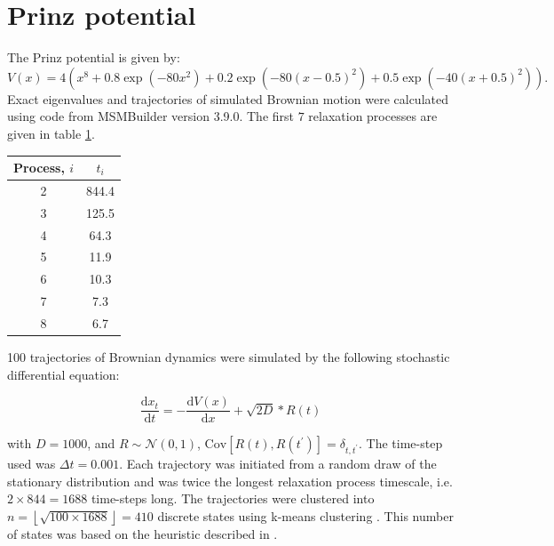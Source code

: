 \section{Prinz potential}
 The Prinz potential is given by: 
\begin{equation}\label{eqn:prinz_pot}
 V(x) = 4\left(x^8 + 0.8 \exp{\left(-80 x^2\right)} + 0.2 \exp{\left(-80 (x-0.5)^2\right)} + 0.5\exp{\left(-40 (x+0.5)^2\right)}\right).
\end{equation}
Exact eigenvalues and trajectories of simulated Brownian motion were calculated using code from MSMBuilder \cite{beauchampMSMBuilder2ModelingConformational2011} version 3.9.0. The first $7$ relaxation processes are given in table \ref{tab:prinz_its_exact}. 
\begin{table}
 \centering
 \begin{tabular}{|c|c|}
 \hline
 Process, $i$ & $t_i$ \\
 \hline\hline
  2 & 844.4 \\
  3 & 125.5 \\
  4 & 64.3 \\
  5 & 11.9 \\
  6 & 10.3 \\
  7 & 7.3 \\
  8 & 6.7 \\
  \hline
 \end{tabular}
 \label{tab:prinz_its_exact}
\end{table}

100 trajectories of Brownian dynamics were simulated by the following stochastic differential equation: 

\begin{equation}\label{eqn:prinz_dynamics}
 \frac{\mathrm{d}x_t}{\mathrm{d}t} = -\frac{\mathrm{d}V(x)}{\mathrm{d}x} + \sqrt{2D} * R(t)
\end{equation}

with $D = 1000$, and $R\sim \mathcal{N}(0, 1)$, $\mathrm{Cov}\left[R(t), R(t^{\prime})\right]=\delta_{t, t^{\prime}}$. The time-step used was $\Delta t = 0.001$. Each trajectory was initiated from a random draw of the stationary distribution and was twice the longest relaxation process timescale, i.e. $2\times 844=1688$ time-steps long. The trajectories were clustered into $n = \left\lfloor\sqrt{100\times 1688}\right\rfloor =410$ discrete states using k-means clustering \cite{friedman2001elements}. This number of states was based on the heuristic described in \cite{husicWardClusteringImproves2017a}.

